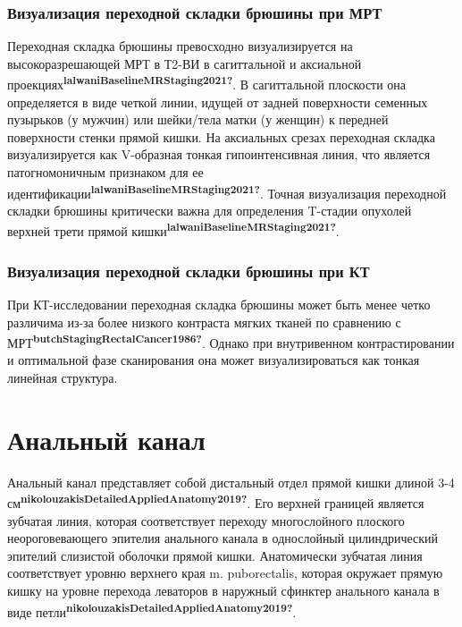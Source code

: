 \documentclass[
  russian,
  12pt,
  a4paper,
]{report}
\begin{document}
\subsubsection{Визуализация переходной складки брюшины при
МРТ}\label{ux432ux438ux437ux443ux430ux43bux438ux437ux430ux446ux438ux44f-ux43fux435ux440ux435ux445ux43eux434ux43dux43eux439-ux441ux43aux43bux430ux434ux43aux438-ux431ux440ux44eux448ux438ux43dux44b-ux43fux440ux438-ux43cux440ux442}

Переходная складка брюшины превосходно визуализируется на
высокоразрешающей МРТ в Т2-ВИ в сагиттальной и аксиальной
проекциях\textsuperscript{\textbf{lalwaniBaselineMRStaging2021?}}. В
сагиттальной плоскости она определяется в виде четкой линии, идущей от
задней поверхности семенных пузырьков (у мужчин) или шейки/тела матки (у
женщин) к передней поверхности стенки прямой кишки. На аксиальных срезах
переходная складка визуализируется как V-образная тонкая гипоинтенсивная
линия, что является патогномоничным признаком для ее
идентификации\textsuperscript{\textbf{lalwaniBaselineMRStaging2021?}}.
Точная визуализация переходной складки брюшины критически важна для
определения T-стадии опухолей верхней трети прямой
кишки\textsuperscript{\textbf{lalwaniBaselineMRStaging2021?}}.

\subsubsection{Визуализация переходной складки брюшины при
КТ}\label{ux432ux438ux437ux443ux430ux43bux438ux437ux430ux446ux438ux44f-ux43fux435ux440ux435ux445ux43eux434ux43dux43eux439-ux441ux43aux43bux430ux434ux43aux438-ux431ux440ux44eux448ux438ux43dux44b-ux43fux440ux438-ux43aux442}

При КТ-исследовании переходная складка брюшины может быть менее четко
различима из-за более низкого контраста мягких тканей по сравнению с
МРТ\textsuperscript{\textbf{butchStagingRectalCancer1986?}}. Однако при
внутривенном контрастировании и оптимальной фазе сканирования она может
визуализироваться как тонкая линейная структура.

\section{Анальный
канал}\label{ux430ux43dux430ux43bux44cux43dux44bux439-ux43aux430ux43dux430ux43b}

Анальный канал представляет собой дистальный отдел прямой кишки длиной
3-4
см\textsuperscript{\textbf{nikolouzakisDetailedAppliedAnatomy2019?}}.
Его верхней границей является зубчатая линия, которая соответствует
переходу многослойного плоского неороговевающего эпителия анального
канала в однослойный цилиндрический эпителий слизистой оболочки прямой
кишки. Анатомически зубчатая линия соответствует уровню верхнего края m.
puborectalis, которая окружает прямую кишку на уровне перехода леваторов
в наружный сфинктер анального канала в виде
петли\textsuperscript{\textbf{nikolouzakisDetailedAppliedAnatomy2019?}}.
\end{document}
